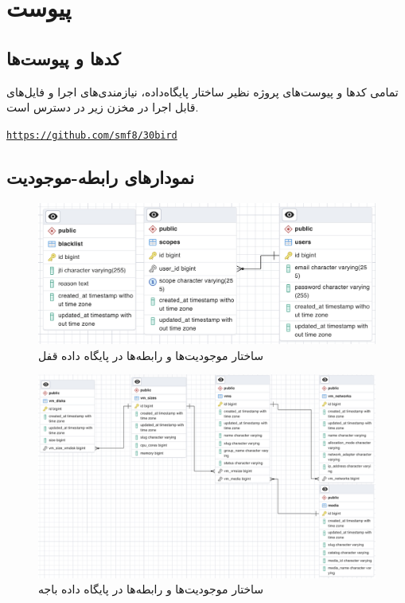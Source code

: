 \chapter*{‌پیوست}


\section*{کد‌ها و پیوست‌ها}
تمامی‌ کد‌ها و پیوست‌های پروژه نظیر ساختار پایگاه‌داده، نیازمندی‌های اجرا و فایل‌های قابل اجرا در مخزن زیر در دسترس است.
\begin{latin}
	\href{https://github.com/smf8/30bird}{\texttt{https://github.com/smf8/30bird}}
\end{latin}

\section*{نمودار‌های رابطه-موجودیت}

\begin{figure}
	\centering
	\includegraphics[width=0.9\linewidth]{figures/erd-ghofl}
	\caption{ساختار موجودیت‌ها و رابطه‌ها در پایگاه داده قفل}
	\label{fig:erd-ghofl}
\end{figure}

\begin{figure}
	\centering
	\includegraphics[width=1\linewidth]{figures/erd-baaje}
	\caption{ساختار موجودیت‌ها و رابطه‌ها در پایگاه داده باجه}
	\label{fig:erd-baaje}
\end{figure}

